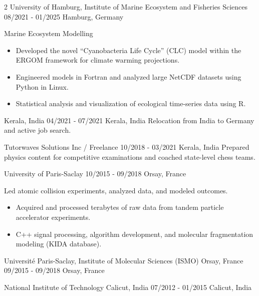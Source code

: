 \documentclass{thejus_cv}
\begin{document}
\begin{paracol}{2}
             {University of Hamburg, Institute of Marine Ecosystem and Fisheries Sciences}
             {08/2021 - 01/2025}
             {Hamburg, Germany}
             {Marine Ecosystem Modelling
             \begin{itemize}
                 \item Developed the novel ``Cyanobacteria Life Cycle'' (CLC) model within the ERGOM framework for climate warming projections.
                 \item Engineered models in Fortran and analyzed large NetCDF datasets using Python in Linux.
                 \item Statistical analysis and visualization of ecological time-series data using R.
             \end{itemize}}

             {Kerala, India}
             {04/2021 - 07/2021}
             {Kerala, India}
             {Relocation from India to Germany and active job search.}

             {Tutorwaves Solutions Inc / Freelance}
             {10/2018 - 03/2021}
             {Kerala, India}
             {Prepared physics content for competitive examinations and coached state-level chess teams.}

             {University of Paris-Saclay}
             {10/2015 - 09/2018}
             {Orsay, France}
             {Led atomic collision experiments, analyzed data, and modeled outcomes.
             \begin{itemize}
                 \item Acquired and processed terabytes of raw data from tandem particle accelerator experiments.
                 \item C++ signal processing, algorithm development, and molecular fragmentation modeling (KIDA database).
             \end{itemize}}



             {Universit\'e Paris-Saclay, Institute of Molecular Sciences (ISMO) Orsay, France}
             {09/2015 - 09/2018}
             {Orsay, France}
             {}

             {National Institute of Technology Calicut, India}
             {07/2012 - 01/2015}
             {Calicut, India}
             {}


\end{paracol}
\end{document}
